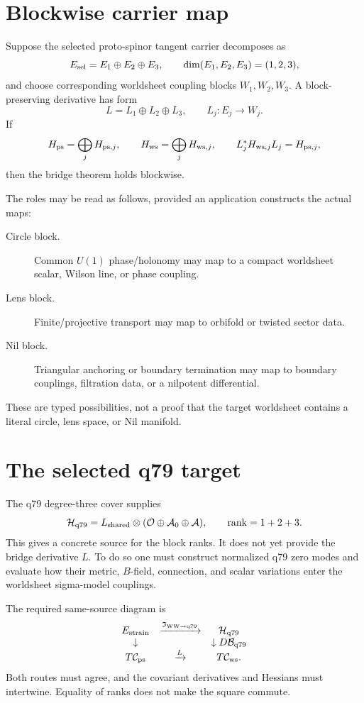 \documentclass[11pt]{article}
\begin{document}
\section{Blockwise carrier map}

Suppose the selected proto-spinor tangent carrier decomposes as
\[
 E_{\rm sel}=E_1\oplus E_2\oplus E_3,
 \qquad \dim(E_1,E_2,E_3)=(1,2,3),
\]
and choose corresponding worldsheet coupling blocks $W_1,W_2,W_3$.  A
block-preserving derivative has form
\[
 L=L_1\oplus L_2\oplus L_3,
 \qquad L_j:E_j\to W_j.
\]
If
\[
 H_{\rm ps}=\bigoplus_j H_{{\rm ps},j},
 \qquad
 H_{\rm ws}=\bigoplus_j H_{{\rm ws},j},
 \qquad
 L_j^*H_{{\rm ws},j}L_j=H_{{\rm ps},j},
\]
then the bridge theorem holds blockwise.

The roles may be read as follows, provided an application constructs the
actual maps:
\begin{description}
\item[Circle block.] Common $U(1)$ phase/holonomy may map to a compact
worldsheet scalar, Wilson line, or phase coupling.
\item[Lens block.] Finite/projective transport may map to orbifold or twisted
sector data.
\item[Nil block.] Triangular anchoring or boundary termination may map to
boundary couplings, filtration data, or a nilpotent differential.
\end{description}

These are typed possibilities, not a proof that the target worldsheet contains
a literal circle, lens space, or Nil manifold.

\section{The selected q79 target}

The q79 degree-three cover supplies
\[
 \mathcal H_{\rm q79}
 =L_{\rm shared}\otimes
 (\mathcal O\oplus\mathcal A_0\oplus\mathcal A),
 \qquad \operatorname{rank}=1+2+3.
\]
This gives a concrete source for the block ranks.  It does not yet provide the
bridge derivative $L$.  To do so one must construct normalized q79 zero modes
and evaluate how their metric, $B$-field, connection, and scalar variations
enter the worldsheet sigma-model couplings.

The required same-source diagram is
\[
\begin{array}{ccc}
 E_{\rm strain}&\xrightarrow{\mathfrak I_{\rm WW\to q79}}&
 \mathcal H_{\rm q79}\\
 \downarrow &&\downarrow D\mathcal B_{\rm q79}\\
 T\mathcal C_{\rm ps}&\xrightarrow{L}&T\mathcal C_{\rm ws}.
\end{array}
\]
Both routes must agree, and the covariant derivatives and Hessians must
intertwine.  Equality of ranks does not make the square commute.
\end{document}
